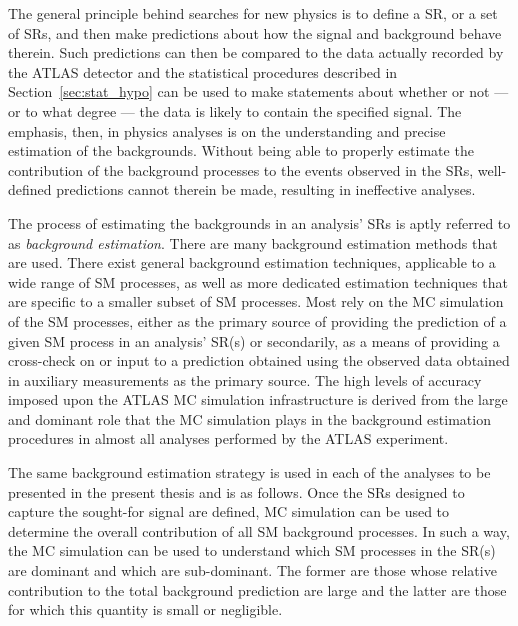 The general principle behind searches for new physics is to define a SR, or a set of SRs,
and then make predictions about how the signal and background behave therein.
Such predictions can then be compared to the data actually recorded by the ATLAS detector
and the statistical procedures described in Section~\ref{sec:stat_hypo} can be used to
make statements about whether or not --- or to what degree --- the data is likely to contain the specified signal.
The emphasis, then, in physics analyses is on the understanding and precise estimation of the backgrounds.
Without being able to properly estimate the contribution of the background processes to the
events observed in the SRs, well-defined predictions cannot therein be made, resulting in ineffective
analyses.

The process of estimating the backgrounds in an analysis' SRs is aptly referred to as
\textit{background estimation}.
There are many background estimation methods that are used.
There exist general background estimation techniques, applicable to a wide range of SM processes,
as well as more dedicated estimation techniques that are specific to a smaller subset of
SM processes.
Most rely on the MC simulation of the SM processes, either as the primary source of providing
the prediction of a given SM process in an analysis' SR(s) or secondarily, as a means of providing a
cross-check on or input to a prediction obtained using the observed data obtained in auxiliary measurements as the primary source.
The high levels of accuracy imposed upon the ATLAS MC simulation infrastructure is derived
from the large and dominant role that the MC simulation plays in the background estimation
procedures in almost all analyses performed by the ATLAS experiment.

The same background estimation strategy is used in each of the analyses to be presented in the
present thesis and is as follows.
Once the SRs designed to capture the sought-for signal are defined, MC simulation can be
used to determine the overall contribution of all SM background processes.
In such a way, the MC simulation can be used to understand which SM processes in the SR(s)
are dominant and which are sub-dominant.
The former are those whose relative contribution to the total background prediction
are large and the latter are those for which this quantity is small or negligible.

